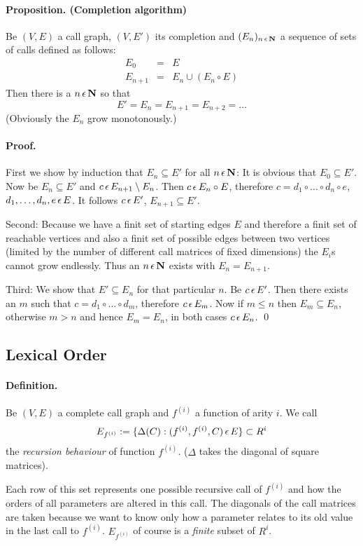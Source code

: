 \paragraph*{Proposition. (Completion algorithm) }
Be $(V,E)$ a call graph, $(V,E')$ its completion and $(E_n)_{n \,\epsilon\,
  \mathbf{N}}$  a sequence of sets of calls defined as follows:
\begin{eqnarray*}
    E_0     & = & E \\
    E_{n+1} & = & E_n \cup (E_n \circ E)
\end{eqnarray*}
Then there is a $n \,\epsilon\, \mathbf{N}$ so that
$$
    E' = E_n = E_{n+1} = E_{n+2} = \dots
$$
(Obviously the $E_n$ grow monotonously.)
\paragraph*{Proof.}
First we show by induction that $E_n \subseteq E'$ for all $n \,\epsilon\,
\mathbf{N}$: It is obvious that $E_0 \subseteq E'$. Now be $E_n \subseteq E'$ and
$c \,\epsilon\, E_{n+1} \setminus E_n$. Then $c \,\epsilon\, E_n \circ E$, therefore $c
= d_1 \circ \dots \circ d_n \circ e$, $d_1, \dots, d_n, e \,\epsilon\, E$. It
follows $c \,\epsilon\, E'$, $E_{n+1} \subseteq E'$.

Second: Because we have a finit set of starting edges $E$ and
therefore a finit set of reachable vertices and also a finit set of
possible edges between two vertices (limited by the number of
different call matrices of fixed dimensions) the $E_i$s cannot grow
endlessly. Thus an $n \,\epsilon\, \mathbf{N}$ exists with $E_n = E_{n+1}$.

Third: We show that $E' \subseteq E_n$ for that particular $n$. Be $c
\,\epsilon\, E'$. Then there exists an $m$ such that $c = d_1 \circ \dots \circ
d_m$, therefore $c \,\epsilon\, E_m$. Now if $m \leq n$ then $E_m \subseteq
E_n$, otherwise $m > n$ and hence $E_m = E_n$, in both cases $c \,\epsilon\, E_n$.
\qed

\subsection{Lexical Order}
\paragraph*{Definition.} Be $(V,E)$ a complete call graph and
$f^{(i)}$ a function of arity $i$. We call
$$
    E_{f^{(i)}} := \{ \Delta(C): (f^{(i)}, f^{(i)}, C) \,\epsilon\, E \}
    \subset R^i
$$
the {\em recursion behaviour} of function $f^{(i)}$. ($\Delta$ takes the
diagonal of square matrices).

Each row of this set represents one possible recursive call of $f^{(i)}$
and how the orders of all parameters are altered in this call. The
diagonals of the call matrices are taken because we want to know only
how a parameter relates to its old value in the last call to
$f^{(i)}$. $E_{f^{(i)}}$ of course is a {\em finite} subset of $R^i$.

